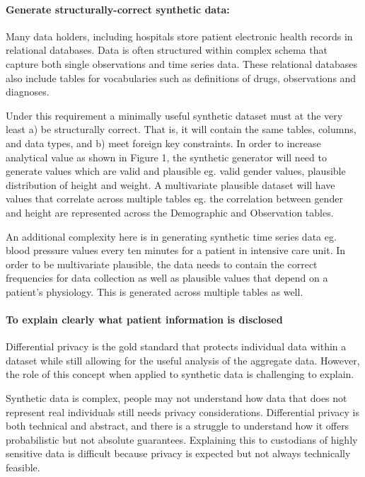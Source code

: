 \documentclass[11pt]{article}
\begin{document}
\paragraph{Generate structurally-correct synthetic data:}

Many data holders, including hospitals store patient electronic health records in relational databases. Data is often structured within complex schema that capture both single observations and time series data. These relational databases also include tables for vocabularies such as definitions of drugs, observations and diagnoses. 

Under this requirement a minimally useful synthetic dataset must at the very least a) be structurally correct. That is, it will contain the same tables, columns, and data types, and b) meet foreign key constraints. In order to increase analytical value as shown in Figure 1, the synthetic generator will need to generate values which are valid and plausible eg. valid gender values, plausible distribution of height and weight.  A multivariate plausible dataset will have values that correlate across multiple tables eg. the correlation between gender and height are represented across the Demographic and Observation tables. 

An additional complexity here is in generating synthetic time series data eg. blood pressure values every ten minutes for a patient in intensive care unit. In order to be multivariate plausible, the data needs to contain the correct frequencies for data collection as well as plausible values that depend on a patient's physiology. This is generated across multiple tables as well.  

\paragraph{To explain clearly what patient information is disclosed}

Differential privacy is the gold standard that protects individual data within a dataset while still allowing for the useful analysis of the aggregate data. However, the role of this concept when applied to synthetic data is challenging to explain. 

Synthetic data is complex, people may not understand how data that does not represent real individuals still needs privacy considerations. Differential privacy is both technical and abstract, and there is a struggle to understand how it offers probabilistic but not absolute guarantees. Explaining this to custodians of highly sensitive data is difficult because privacy is expected but not always technically feasible.
\end{document}
